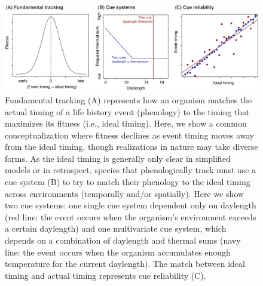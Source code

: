 \documentclass[11pt,letterpaper]{article}
\begin{document}
\begin{figure}[h!]
\centering
\includegraphics[width=1\textwidth]{..//..//..//R/graphs/conceptual/envtracking_define2.png}
\caption{Fundamental tracking (A) represents how an organism matches the actual timing of a life history event (phenology) to the timing that maximizes its fitness (i.e., ideal timing). Here, we show a common conceptualization where fitness declines as event timing moves away from the ideal timing, though realizations in nature may take diverse forms. As the ideal timing is generally only clear in simplified models or in retrospect, species that phenologically track must use a cue system (B) to try to match their phenology to the ideal timing across environments (temporally and/or spatially). Here we show two cue systems: one single cue system dependent only on daylength (red line: the event occurs when the organism's environment exceeds a certain daylength) and one multivariate cue system, which depends on a combination of daylength and thermal sums (navy line: the event occurs when the organism accumulates enough temperature for the current daylength). The match between ideal timing and actual timing represents cue reliability (C). } 
 \label{fig:defineETorig}
\end{figure}
\end{document}
